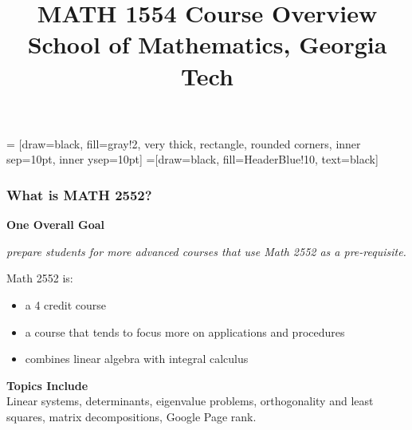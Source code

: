 \documentclass[xcolor=table,11pt,notes=hide,t,handout]{beamer}
\begin{document}
 = [draw=black, fill=gray!2, very thick, rectangle, rounded corners, inner sep=10pt, inner ysep=10pt]
 =[draw=black, fill=HeaderBlue!10, text=black]


\title{
MATH 1554 Course Overview \\
\vspace{24pt} 
{\small School of Mathematics, Georgia Tech \\[2pt]}

\vspace{1cm} 

}


\date{} 
\maketitle

\setcounter{section}{1}

\begin{frame}\frametitle{What is MATH 2552?}

    \textbf{One Overall Goal}
    \begin{center}
        \textit{prepare students for more advanced courses that use Math 2552 as a pre-requisite.}
    \end{center}
    Math 2552 is:
    \begin{itemize}
        \item a 4 credit course
        \item a course that tends to focus more on applications and procedures
        \item combines linear algebra with integral calculus
    \end{itemize}
    \vspace{12pt}
    \textbf{Topics Include}\\
    Linear systems, determinants, eigenvalue problems, orthogonality and least squares, matrix decompositions, Google Page rank.

\end{frame}
\end{document}
